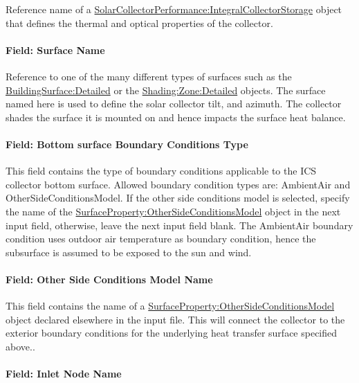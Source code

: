 Reference name of a \hyperref[solarcollectorperformanceintegralcollectorstorage]{SolarCollectorPerformance:IntegralCollectorStorage} object that defines the thermal and optical properties of the collector.

\paragraph{Field: Surface Name}\label{field-surface-name-1-001}

Reference to one of the many different types of surfaces such as the \hyperref[buildingsurfacedetailed]{BuildingSurface:Detailed} or the \hyperref[shadingzonedetailed-000]{Shading:Zone:Detailed} objects. The surface named here is used to define the solar collector tilt, and azimuth. The collector shades the surface it is mounted on and hence impacts the surface heat balance.

\paragraph{Field: Bottom surface Boundary Conditions Type}\label{field-bottom-surface-boundary-conditions-type}

This field contains the type of boundary conditions applicable to the ICS collector bottom surface. Allowed boundary condition types are: AmbientAir and OtherSideConditionsModel. If the other side conditions model is selected, specify the name of the \hyperref[surfacepropertyothersideconditionsmodel]{SurfaceProperty:OtherSideConditionsModel} object in the next input field, otherwise, leave the next input field blank. The AmbientAir boundary condition uses outdoor air temperature as boundary condition, hence the subsurface is assumed to be exposed to the sun and wind.

\paragraph{Field: Other Side Conditions Model Name}\label{field-other-side-conditions-model-name}

This field contains the name of a \hyperref[surfacepropertyothersideconditionsmodel]{SurfaceProperty:OtherSideConditionsModel} object declared elsewhere in the input file. This will connect the collector to the exterior boundary conditions for the underlying heat transfer surface specified above..

\paragraph{Field: Inlet Node Name}\label{field-inlet-node-name-1-004}

